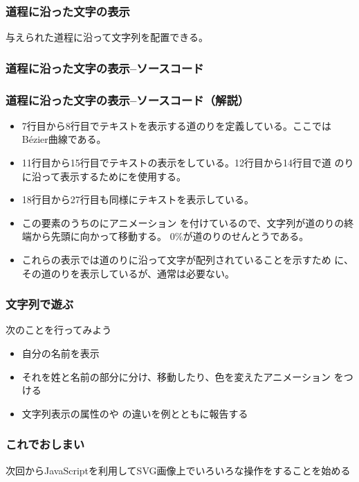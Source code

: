 \begin{frame}[containsverbatim]
 \frametitle{道程に沿った文字の表示}
 与えられた道程に沿って文字列を配置できる。
 \end{frame}
\begin{frame}[containsverbatim]
 \frametitle{道程に沿った文字の表示--ソースコード}
 \end{frame}
\begin{frame}[containsverbatim]
 \frametitle{道程に沿った文字の表示--ソースコード（解説）}
 \begin{itemize}
	\item 7行目から8行目でテキストを表示する道のりを定義している。ここでは
				B\'ezier曲線である。
	\item 11行目から15行目でテキストの表示をしている。12行目から14行目で道
				のりに沿って表示するためにを使用する。
	\item 18行目から27行目も同様にテキストを表示している。
	\item この要素のうちのにアニメーション
				を付けているので、文字列が道のりの終端から先頭に向かって移動する。
				$0\%$が道のりのせんとうである。
	\item これらの表示では道のりに沿って文字が配列されていることを示すため
				に、その道のりを表示しているが、通常は必要ない。
 \end{itemize}
 \end{frame}
	\begin{frame}[containsverbatim]
 \frametitle{文字列で遊ぶ}
 次のことを行ってみよう
\begin{itemize}
 \item 自分の名前を表示
 \item それを姓と名前の部分に分け、移動したり、色を変えたアニメーション
       をつける
 \item 文字列表示の属性のや
       の違いを例とともに報告する
\end{itemize}
	\end{frame}
\begin{frame}[containsverbatim]
 \frametitle{これでおしまい}
 次回からJavaScriptを利用してSVG画像上でいろいろな操作をすることを始める
\end{frame}


